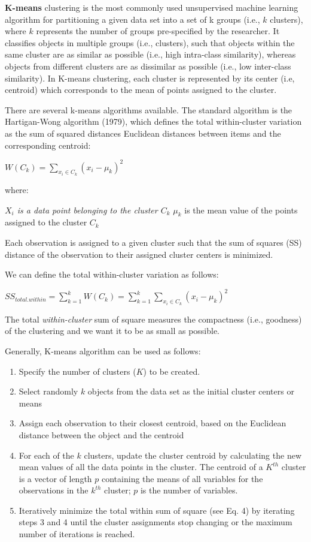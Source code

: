 \documentclass[]{book}
\providecommand{\tightlist}{%
  \setlength{\itemsep}{0pt}\setlength{\parskip}{0pt}}
\begin{document}
\textbf{K-means} clustering is the most commonly used unsupervised machine learning algorithm for partitioning a given data set into a set of k groups (i.e., \(k\) clusters), where \(k\) represents the number of groups pre-specified by the researcher. It classifies objects in multiple groups (i.e., clusters), such that objects within the same cluster are as similar as possible (i.e., high intra-class similarity), whereas objects from different clusters are as dissimilar as possible (i.e., low inter-class similarity). In K-means clustering, each cluster is represented by its center (i.e, centroid) which corresponds to the mean of points assigned to the cluster.

There are several k-means algorithms available. The standard algorithm is the Hartigan-Wong algorithm (1979), which defines the total within-cluster variation as the sum of squared distances Euclidean distances between items and the corresponding centroid:

\(W(C_k) = \sum_{x_i \in C_k}(x_i - \mu_k)^2\)

where:

\emph{\(X_i\) is a data point belonging to the cluster \(C_k\)
}\(\mu_k\) is the mean value of the points assigned to the cluster \(C_k\)

Each observation is assigned to a given cluster such that the sum of squares (SS) distance of the observation to their assigned cluster centers is minimized.

We can define the total within-cluster variation as follows:

\(SS_{total.within} = \sum^k_{k=1}W(C_k) = \sum^k_{k=1}\sum_{x_i \in C_k}(x_i - \mu_k)^2\)

The total \emph{within-cluster} sum of square measures the compactness (i.e., goodness) of the clustering and we want it to be as small as possible.

Generally, K-means algorithm can be used as follows:

\begin{enumerate}
\def\labelenumi{\arabic{enumi}.}
\tightlist
\item
  Specify the number of clusters (\(K\)) to be created.
\item
  Select randomly \(k\) objects from the data set as the initial cluster centers or means
\item
  Assign each observation to their closest centroid, based on the Euclidean distance between the object and the centroid
\item
  For each of the \(k\) clusters, update the cluster centroid by calculating the new mean values of all the data points in the cluster. The centroid of a \(K^{th}\) cluster is a vector of length \(p\) containing the means of all variables for the observations in the \(k^{th}\) cluster; \(p\) is the number of variables.
\item
  Iteratively minimize the total within sum of square (see Eq. 4) by iterating steps 3 and 4 until the cluster assignments stop changing or the maximum number of iterations is reached.
\end{enumerate}
\end{document}
